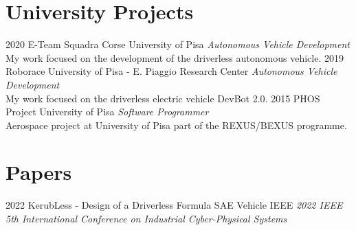 \documentclass[]{friggeri-cv}
\begin{document}
\section{University Projects}
\vspace{-3mm}
\begin{entrylist}
\entry
{2020}
{E-Team Squadra Corse}
{University of Pisa}
{\emph{Autonomous Vehicle Development}\\
My work focused on the development of the driverless autonomous vehicle.}
\entry
{2019}
{Roborace}
{University of Pisa - E. Piaggio Research Center}
{\emph{Autonomous Vehicle Development}\\
My work focused on the driverless electric vehicle DevBot 2.0.}
\entry
{2015}
{PHOS Project}
{University of Pisa}
{\emph{Software Programmer}\\
Aerospace project at University of Pisa part of the REXUS/BEXUS programme.}
\end{entrylist}

\patchcmd{\entry}{14.8cm}{11.8cm}{}{}
\section{Papers}
\vspace{-3mm}
\begin{entrylist}
\entry
{2022}
{KerubLess - Design of a Driverless Formula SAE Vehicle}
{IEEE}
{\emph{2022 IEEE 5th International Conference on Industrial Cyber-Physical Systems}}
\end{entrylist}

\patchcmd{\entry}{14.8cm}{11.8cm}{}{}
\end{document}
